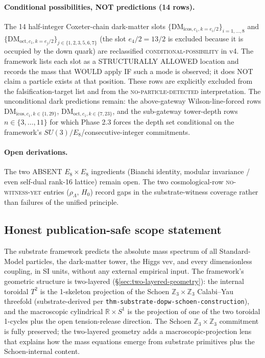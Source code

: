 ﻿\documentclass[reprint,amsmath,amssymb,aps,prd,longbibliography,floatfix]{revtex4-2}
\begin{document}
\paragraph{Conditional possibilities, NOT predictions (14 rows).} The
14 half-integer Coxeter-chain dark-matter slots
\(\{ \mathrm{DM}_{\mathrm{icos}, c_1, k = e_i / 2} \}_{i = 1, \dots, 8}\)
and
\(\{ \mathrm{DM}_{\mathrm{oct}, c_1, k = e_j / 2} \}_{j \in \{1, 2, 3, 5, 6, 7\}}\)
(the slot $e_4 / 2 = 13/2$ is excluded because it is occupied by the
down quark) are reclassified \textsc{conditional-possibility} in v4.
The framework lists each slot as a STRUCTURALLY ALLOWED location and
records the mass that WOULD apply IF such a mode is observed; it does
NOT claim a particle exists at that position. These rows are
explicitly excluded from the falsification-target list and from the
\textsc{no-particle-detected} interpretation. The unconditional dark
predictions remain: the above-gateway Wilson-line-forced rows
$\mathrm{DM}_{\mathrm{icos}, c_1, k \in \{1, 29\}}$,
$\mathrm{DM}_{\mathrm{oct}, c_1, k \in \{7, 23\}}$, and the
sub-gateway tower-depth rows $n \in \{3, \ldots, 11\}$ for which
Phase 2.3 forces the depth set conditional on the framework's
$SU(3)/E_8$/consecutive-integer commitments.

\paragraph{Open derivations.} The two ABSENT $E_8 \times E_8$
ingredients (Bianchi identity, modular invariance / even self-dual
rank-16 lattice) remain open. The two cosmological-row
\textsc{no-witness-yet} entries ($\rho_\Lambda$, $H_0$) record gaps in
the substrate-witness coverage rather than failures of the unified
principle.

\subsection{Honest publication-safe scope statement}
\label{sec:scope-statement}

The substrate framework predicts the absolute mass spectrum of all
Standard-Model particles, the dark-matter tower, the Higgs vev, and
every dimensionless coupling, in SI units, without any external
empirical input. The framework's geometric structure is two-layered
(\S\ref{sec:two-layered-geometry}): the internal toroidal $T^2$ is
the 1-skeleton projection of the Schoen
$\mathbb{Z}_3 \times \mathbb{Z}_3$ Calabi--Yau threefold
(substrate-derived per
\texttt{thm-substrate-dopw-schoen-construction}), and the
macroscopic cylindrical $\mathbb{R} \times S^1$ is the projection of
one of the two toroidal 1-cycles plus the open tension-release
direction. The Schoen $\mathbb{Z}_3 \times \mathbb{Z}_3$ commitment
is fully preserved; the two-layered geometry adds a
macroscopic-projection lens that explains how the mass equations
emerge from substrate primitives plus the Schoen-internal content.
\end{document}
